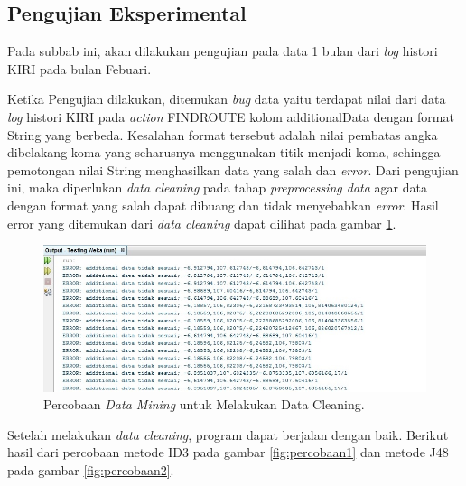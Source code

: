 \subsection{Pengujian Eksperimental}

Pada subbab ini, akan dilakukan pengujian pada data 1 bulan dari \textsl{log} histori KIRI pada bulan Febuari.

Ketika Pengujian dilakukan, ditemukan \textsl{bug} data yaitu terdapat nilai dari data \textsl{log} histori KIRI pada \textsl{action} FINDROUTE kolom additionalData dengan format String yang berbeda. Kesalahan format tersebut adalah nilai pembatas angka dibelakang koma yang seharusnya menggunakan titik menjadi koma, sehingga pemotongan nilai String menghasilkan data yang salah dan \textsl{error}. Dari pengujian ini, maka diperlukan \textsl{data cleaning} pada tahap \textsl{preprocessing data} agar data dengan format yang salah dapat dibuang dan tidak menyebabkan \textsl{error}. Hasil error yang ditemukan dari \textsl{data cleaning} dapat dilihat pada gambar \ref{fig:percobaanError}.

\begin{figure}[H]
\centering
\includegraphics[scale=0.5]{Gambar/percobaanError.jpg}
\caption[Percobaan \textsl{Data Mining} untuk Melakukan Data Cleaning]{Percobaan \textsl{Data Mining} untuk Melakukan Data Cleaning.} 
\label{fig:percobaanError}
\end{figure}

Setelah melakukan \textsl{data cleaning}, program dapat berjalan dengan baik. Berikut hasil dari percobaan metode ID3 pada gambar \ref{fig:percobaan1} dan metode J48 pada gambar \ref{fig:percobaan2}.

